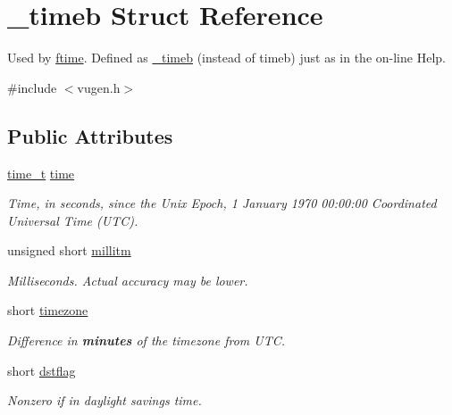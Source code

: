 \hypertarget{struct__timeb}{\section{\-\_\-timeb Struct Reference}
\label{struct__timeb}
}


Used by \hyperlink{group__time_gafc0d3a1676a915f3cedcad79759f6802}{ftime}. Defined as \hyperlink{struct__timeb}{\-\_\-timeb} (instead of timeb) just as in the on-\/line Help.  




{\ttfamily \#include $<$vugen.\-h$>$}

\subsection*{Public Attributes}
\begin{DoxyCompactItemize}
\item 
\hypertarget{struct__timeb_a928964f8921238f2f1cd9b00156c2193}{\hyperlink{group__time_ga824afaa48b313f905546cf45822800fc}{time\-\_\-t} \hyperlink{struct__timeb_a928964f8921238f2f1cd9b00156c2193}{time}}\label{struct__timeb_a928964f8921238f2f1cd9b00156c2193}

\begin{DoxyCompactList}\small\item\em Time, in seconds, since the Unix Epoch, 1 January 1970 00\-:00\-:00 Coordinated Universal Time (U\-T\-C). \end{DoxyCompactList}\item 
\hypertarget{struct__timeb_a975ceacec134ed49ae57e8f5c4818508}{unsigned short \hyperlink{struct__timeb_a975ceacec134ed49ae57e8f5c4818508}{millitm}}\label{struct__timeb_a975ceacec134ed49ae57e8f5c4818508}

\begin{DoxyCompactList}\small\item\em Milliseconds. Actual accuracy may be lower. \end{DoxyCompactList}\item 
\hypertarget{struct__timeb_a9b12daae5dfc9bd4a2b60836da302d01}{short \hyperlink{struct__timeb_a9b12daae5dfc9bd4a2b60836da302d01}{timezone}}\label{struct__timeb_a9b12daae5dfc9bd4a2b60836da302d01}

\begin{DoxyCompactList}\small\item\em Difference in {\bfseries minutes} of the timezone from U\-T\-C. \end{DoxyCompactList}\item 
\hypertarget{struct__timeb_a43a79bdcf9506128af4cfa1d08ce722f}{short \hyperlink{struct__timeb_a43a79bdcf9506128af4cfa1d08ce722f}{dstflag}}\label{struct__timeb_a43a79bdcf9506128af4cfa1d08ce722f}

\begin{DoxyCompactList}\small\item\em Nonzero if in daylight savings time. \end{DoxyCompactList}\end{DoxyCompactItemize}


